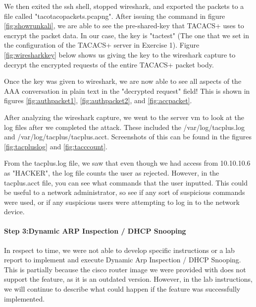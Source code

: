 \documentclass[main.tex]{subfiles}
\begin{document}
We then exited the ssh shell, stopped wireshark, and exported the packets to a file called "tacotaco\textunderscore packets.pcapng".
\hfill \break
After issuing the command in figure \ref{fig:showrunkali}, we are able to see the pre-shared-key that TACACS+ uses to encrypt the packet data. In our case, the key is "tac\textunderscore test" (The one that we set in the configuration of the TACACS+ server in Exercise 1). Figure \ref{fig:wiresharkkey} below shows us giving the key to the wireshark capture to decrypt the encrypted requests of the entire TACACS+ packet body.

Once the key was given to wireshark, we are now able to see all aspects of the AAA conversation in plain text in the "decrypted request" field! This is shown in figures \ref{fig:authpacket1}, \ref{fig:authpacket2}, and \ref{fig:accpacket}.

After analyzing the wireshark capture, we went to the server vm to look at the log files after we completed the attack. These included the /var/log/tac\textunderscore plus.log and /var/log/tac\textunderscore plus/tac\textunderscore plus.acct. Screenshots of this can be found in the figures \ref{fig:tacpluslog} and \ref{fig:tacccount}.

From the tac\textunderscore plus.log file, we saw that even though we had access from 10.10.10.6 as "HACKER", the log file counts the user as rejected. However, in the tac\textunderscore plus.acct file, you can see what commands that the user inputted. This could be useful to a network administrator, so see if any sort of suspicious commands were used, or if any suspicious users were attempting to log in to the network device.

\paragraph{Step 3:Dynamic ARP Inspection / DHCP Snooping}
\hfill \break
In respect to time, we were not able to develop specific instructions or a lab report to implement and execute Dynamic Arp Inspection / DHCP Snooping. This is partially because the cisco router image we were provided with does not support the feature, as it is an outdated version. However, in the lab instructions, we will continue to describe what could happen if the feature was successfully implemented.
\end{document}
